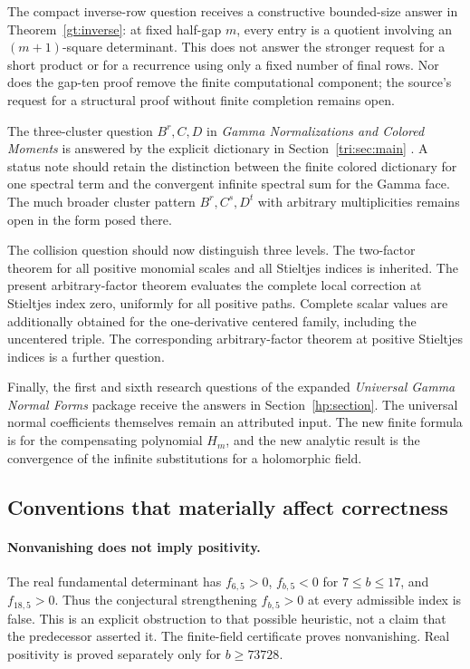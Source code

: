 \documentclass[11pt,a4paper]{article}
\theoremstyle{definition}
\theoremstyle{remark}
\numberwithin{equation}{section}
\begin{document}
The compact inverse-row question receives a constructive bounded-size
answer in Theorem~\ref{gt:inverse}: at fixed half-gap $m$, every entry
is a quotient involving an $(m+1)$-square determinant. This does not
answer the stronger request for a short product or for a recurrence
using only a fixed number of final rows. Nor does the gap-ten proof
remove the finite computational component; the source's request for
a structural proof without finite completion remains open.

The three-cluster question $B^r,C,D$ in
\emph{Gamma Normalizations and Colored Moments} is answered by the
explicit dictionary in Section~\ref{tri:sec:main}
\cite{GammaColored}. A status note should retain the distinction between
the finite colored dictionary for one spectral term and the convergent
infinite spectral sum for the Gamma face. The much broader cluster
pattern $B^r,C^s,D^t$ with arbitrary multiplicities remains open in the
form posed there.

The collision question should now distinguish three levels. The
two-factor theorem for all positive monomial scales and all Stieltjes
indices is inherited. The present arbitrary-factor theorem evaluates
the complete local correction at Stieltjes index zero, uniformly for
all positive paths. Complete scalar values are additionally obtained
for the one-derivative centered family, including the uncentered
triple. The corresponding arbitrary-factor theorem at positive
Stieltjes indices is a further question.

Finally, the first and sixth research questions of the expanded
\emph{Universal Gamma Normal Forms} package receive the answers in
Section~\ref{hp:section}. The universal normal coefficients themselves
remain an attributed input. The new finite formula is for the
compensating polynomial $H_m$, and the new analytic result is the
convergence of the infinite substitutions for a holomorphic field.

\subsection{Conventions that materially affect correctness}

\paragraph{Nonvanishing does not imply positivity.}
The real fundamental determinant has
$f_{6,5}>0$, $f_{b,5}<0$ for $7\le b\le17$, and $f_{18,5}>0$.
Thus the conjectural strengthening $f_{b,5}>0$ at every admissible
index is false. This is an explicit obstruction to that possible
heuristic, not a claim that the predecessor asserted it. The
finite-field certificate proves nonvanishing. Real positivity is
proved separately only for $b\ge73728$.
\end{document}
